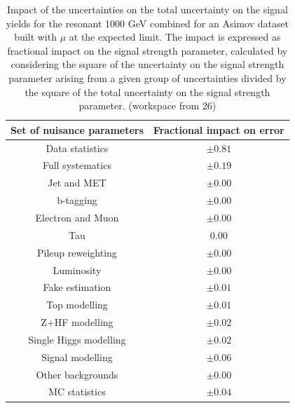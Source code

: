 \begin{table}
\centering
\begin{tabular}{|c|c|}
\hline
Set of nuisance parameters & Fractional impact on error\\
\hline
Data statistics & $\pm 0.81$\\
Full systematics & $\pm 0.19$\\
Jet and MET & $\pm 0.00$ \\
b-tagging & $\pm 0.00$\\
Electron and Muon & $\pm 0.00$\\
Tau & $0.00$\\
Pileup reweighting & $\pm 0.00$\\
Luminosity & $\pm 0.00$\\
Fake estimation & $\pm 0.01$\\
Top modelling & $\pm 0.01$\\ 
Z+HF modelling & $\pm 0.02$\\
Single Higgs modelling & $\pm 0.02$\\
Signal modelling & $\pm 0.06$\\
Other backgrounds & $\pm 0.00$\\
MC statistics & $\pm 0.04$\\
\hline
\end{tabular}
\caption{Impact of the uncertainties on the total uncertainty on the signal yields for the resonant 1000 GeV combined for an Asimov dataset built with $\mu$ at the expected limit. The impact is expressed as fractional impact on the signal strength parameter,  calculated by considering the square of the uncertainty on the signal strength parameter arising from a given group of uncertainties divided by the square of the total uncertainty on the signal strength parameter.  (workspace from 26)}
\label{sec:fit:tab:CombBreakdown2HDM1000Asimov}
\end{table}



